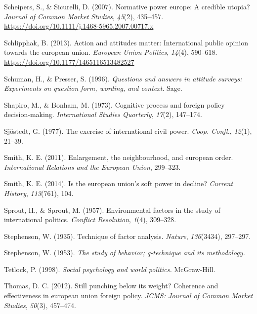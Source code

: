 \documentclass[
  letterpaper,
  DIV=11,
  numbers=noendperiod]{scrartcl}
\newlength{\cslhangindent}
\newenvironment{CSLReferences}[2] %
 {\begin{list}{}{%
  \setlength{\itemindent}{0pt}
  \setlength{\leftmargin}{0pt}
  \setlength{\parsep}{0pt}
  \ifodd #1
   \setlength{\leftmargin}{\cslhangindent}
   \setlength{\itemindent}{-1\cslhangindent}
  \fi
  \setlength{\itemsep}{#2\baselineskip}}}
 {\end{list}}
\begin{document}
\begin{CSLReferences}{1}{0}
Scheipers, S., \& Sicurelli, D. (2007). Normative power europe: A
credible utopia? \emph{Journal of Common Market Studies}, \emph{45}(2),
435--457. \url{https://doi.org/10.1111/j.1468-5965.2007.00717.x}

Schlipphak, B. (2013). Action and attitudes matter: International public
opinion towards the european union. \emph{European Union Politics},
\emph{14}(4), 590--618. \url{https://doi.org/10.1177/1465116513482527}

Schuman, H., \& Presser, S. (1996). \emph{Questions and answers in
attitude surveys: Experiments on question form, wording, and context}.
Sage.

Shapiro, M., \& Bonham, M. (1973). Cognitive process and foreign policy
decision-making. \emph{International Studies Quarterly}, \emph{17}(2),
147--174.

Sjöstedt, G. (1977). The exercise of international civil power.
\emph{Coop. Confl.}, \emph{12}(1), 21--39.

Smith, K. E. (2011). Enlargement, the neighbourhood, and european order.
\emph{International Relations and the European Union}, 299--323.

Smith, K. E. (2014). Is the european union's soft power in decline?
\emph{Current History}, \emph{113}(761), 104.

Sprout, H., \& Sprout, M. (1957). Environmental factors in the study of
international politics. \emph{Conflict Resolution}, \emph{1}(4),
309--328.

Stephenson, W. (1935). Technique of factor analysis. \emph{Nature},
\emph{136}(3434), 297--297.

Stephenson, W. (1953). \emph{The study of behavior; q-technique and its
methodology.}

Tetlock, P. (1998). \emph{Social psychology and world politics.}
McGraw-Hill.

Thomas, D. C. (2012). Still punching below its weight? Coherence and
effectiveness in european union foreign policy. \emph{JCMS: Journal of
Common Market Studies}, \emph{50}(3), 457--474.


\end{CSLReferences}
\end{document}
